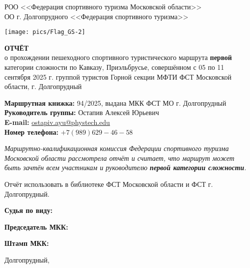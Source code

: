\begin{titlepage}
\setlength\parindent{0pt}
	\begin{center}
		\large{РОО <<Федерация спортивного туризма Московской области>>\\
		ОО г. Долгопрудного <<Федерация спортивного туризма>>\\}
	\end{center}

	


	
	\begin{center}
		\texttt{[image: pics/Flag\_GS-2]}
		
		\Large{\bfseries{ОТЧЁТ}} \\
		\normalsize о прохождении пешеходного спортивного туристического маршрута \textbf{первой} категории сложности по Кавказу, Приэльбрусье, совершённом с 05 по 11 сентября 2025 г. группой туристов Горной секции МФТИ ФСТ Московской области, г. Долгопрудный
	\end{center}
	\vspace{1.5 cm}
	
	\textbf{Маршрутная книжка:} 94/2025, выдана МКК ФСТ МО г. Долгопрудный \\ 
	\textbf{Руководитель группы:} Остапив Алексей Юрьевич\\
	\textbf{E-mail:} \href{mailto: ostapiv.ayu@phystech.edu}{ostapiv.ayu@phystech.edu}\\
	\textbf{Номер телефона:} $+7(989)629-46-58$
	
	\vspace{0.2cm}
	
	\textit{Маршрутно-квалификационная комиссия Федерации спортивного туризма Московской области рассмотрела отчёт и считает, что маршрут может быть зачтён всем участникам и руководителю \textbf{первой категории сложности}.}

	\vspace{0.2cm}
	
	Отчёт использовать в библиотеке ФСТ Московской области и ФСТ г. Долгопрудный.
	
	\vspace{0.8cm}
	\textbf{Судья по виду:} 
	
	
	\vspace{0.8cm}
	\textbf{Председатель МКК:}
	
	\vspace{0.8cm}
	\textbf{Штамп МКК:}
	
	\vfill
	\begin{center}
		Долгопрудный,   \the\year{}
	\end{center}
\end{titlepage}